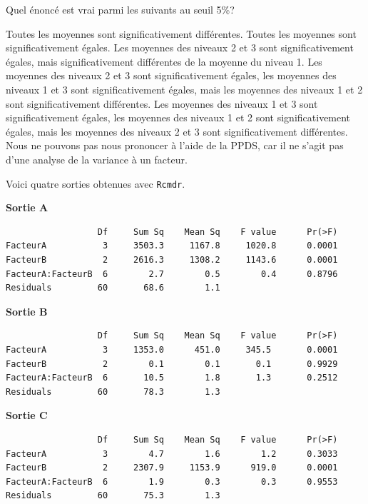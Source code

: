 \begin{questions}
Quel énoncé est vrai parmi les suivants au seuil 5\%?


\begin{checkboxes}
    \choice Toutes les moyennes sont significativement différentes.
    \choice Toutes les moyennes sont significativement égales.
    \choice Les moyennes des niveaux 2 et 3 sont significativement égales, mais significativement différentes de la moyenne du niveau 1.
    \correctchoice Les moyennes des niveaux 2 et 3 sont significativement égales, les moyennes des niveaux 1 et 3 sont significativement égales, mais les moyennes des niveaux 1 et 2 sont significativement différentes.
    \choice Les moyennes des niveaux 1 et 3 sont significativement égales, les moyennes des niveaux 1 et 2 sont significativement égales, mais les moyennes des niveaux 2 et 3 sont significativement différentes.
    \choice Nous ne pouvons pas nous prononcer à l'aide de la PPDS, car il ne s'agit pas d'une analyse de la variance à un facteur.
    \end{checkboxes}

    
\newpage

\question[3] 

Voici quatre sorties obtenues avec \texttt{Rcmdr}.

\smallskip
{\bf Sortie A}
\begin{verbatim}
                  Df     Sum Sq    Mean Sq    F value      Pr(>F)    
FacteurA           3     3503.3     1167.8     1020.8      0.0001
FacteurB           2     2616.3     1308.2     1143.6      0.0001
FacteurA:FacteurB  6        2.7        0.5        0.4      0.8796    
Residuals         60       68.6        1.1                        
\end{verbatim}

{\bf Sortie B}
\begin{verbatim}
                  Df     Sum Sq    Mean Sq    F value      Pr(>F)   
FacteurA           3     1353.0      451.0     345.5       0.0001
FacteurB           2        0.1        0.1       0.1       0.9929    
FacteurA:FacteurB  6       10.5        1.8       1.3       0.2512    
Residuals         60       78.3        1.3                           
\end{verbatim}

{\bf Sortie C}
\begin{verbatim}
                  Df     Sum Sq    Mean Sq    F value      Pr(>F)    
FacteurA           3        4.7        1.6        1.2      0.3033    
FacteurB           2     2307.9     1153.9      919.0      0.0001
FacteurA:FacteurB  6        1.9        0.3        0.3      0.9553    
Residuals         60       75.3        1.3                    
\end{verbatim}


\end{questions}

